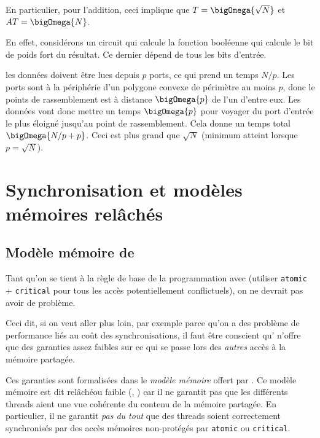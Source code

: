En particulier, pour l'addition, ceci implique que $T = \bigOmega{\sqrt{N}}$ et
$AT = \bigOmega{N}$.

\begin{danger}
  En effet, considérons un circuit qui calcule la fonction booléenne qui calcule
  le bit de poids fort du résultat. Ce dernier dépend de tous les bits
  d'entrée.

  les données doivent être lues depuis $p$ ports, ce qui prend un temps
  $N/p$. Les ports sont à la périphérie d'un polygone convexe de périmètre au
  moins $p$, donc le points de rassemblement est à distance $\bigOmega{p}$ de
  l'un d'entre eux. Les données vont donc mettre un temps $\bigOmega{p}$ pour
  voyager du port d'entrée le plus éloigné jusqu'au point de rassemblement. Cela
  donne un temps total $\bigOmega{N/p + p}$. Ceci est plus grand que $\sqrt{N}$
  (minimum atteint lorsque $p = \sqrt{N}$).
\end{danger}


\chapter{Synchronisation et modèles mémoires relâchés}

\section{Modèle mémoire de \OMP}

Tant qu'on se tient à la règle de base de la programmation avec \OMP
(utiliser \texttt{atomic} + \texttt{critical} pour tous les accès
potentiellement
conflictuels), %
on ne devrait pas avoir de problème.

Ceci dit, si on veut aller plus loin, par exemple parce qu'on a des problème de
performance liés au coût des synchronisations, il faut être conscient qu'\OMP
n'offre que des garanties assez faibles sur ce qui se passe lors des
\emph{autres} accès à la mémoire partagée.

Ces garanties sont formalisées dans le \emph{modèle mémoire} offert
par \OMP. Ce modèle mémoire est dit \og relâché\fg ou \og faible\fg{}
(, ) car il ne garantit pas que les
différents threads aient une vue cohérente du contenu de la mémoire
partagée. En particulier, il ne garantit \emph{pas du tout} que des
threads soient correctement synchronisés par des accès mémoires %
non-protégés
par \texttt{atomic} ou \texttt{critical}.

